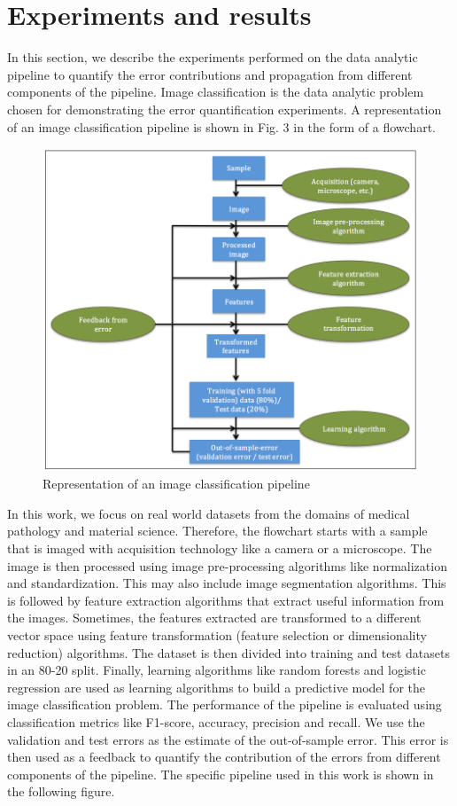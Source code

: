  

\section{Experiments and results}
\label{sec4}
In this section, we describe the experiments performed on the data analytic pipeline to quantify the error contributions and propagation from different components of the pipeline. Image classification is the data analytic problem chosen for demonstrating the error quantification experiments. A representation of an image classification pipeline is shown in Fig. 3 in the form of a flowchart.  
\begin{figure}[H]
\label{flowchart}
    \centering
    \includegraphics[scale=0.5]{img/EP/flowchart}
    \caption{Representation of an image classification pipeline}
\end{figure}
In this work, we focus on real world datasets from the domains of medical pathology and material science.  Therefore, the flowchart starts with a sample that is imaged with acquisition technology like a camera or a microscope. The image is then processed using image pre-processing algorithms like normalization and standardization. This may also include image segmentation algorithms. This is followed by feature extraction algorithms that extract useful information from the images. Sometimes, the features extracted are transformed to a different vector space using feature transformation (feature selection or dimensionality reduction) algorithms. The dataset is then divided into training and test datasets in an 80-20 split. Finally, learning algorithms like random forests and logistic regression are used as learning algorithms to build a predictive model for the image classification problem. The performance of the pipeline is evaluated using classification metrics like F1-score, accuracy, precision and recall. We use the validation and test errors as the estimate of the out-of-sample error. This error is then used as a feedback to quantify the contribution of the errors from different components of the pipeline. The specific pipeline used in this work is shown in the following figure.


